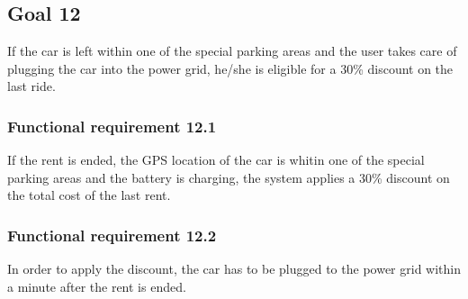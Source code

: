 \subsection{Goal 12}
If the car is left within one of the special parking areas and the user takes care of plugging the car into the power grid, he/she is eligible for a 30\% discount on the last ride.

\setcounter{secnumdepth}{3}
\subsubsection{Functional requirement 12.1}
If the rent is ended, the GPS location of the car is whitin one of the special parking areas and the battery is charging, the system applies a 30\% discount on the total cost of the last rent.

\subsubsection{Functional requirement 12.2}
In order to apply the discount, the car has to be plugged to the power grid within a minute after the rent is ended.
